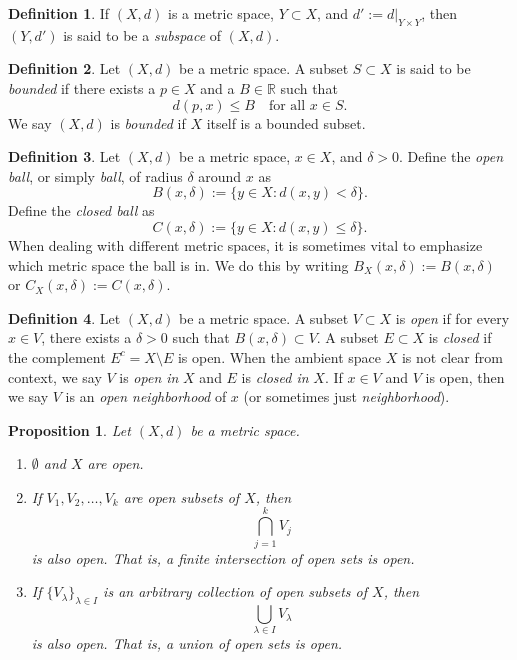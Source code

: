 \documentclass{article}
\newtheorem{proposition}{Proposition}[section]
\theoremstyle{definition}
\newtheorem{definition}{Definition}[section]
\theoremstyle{remark}
\begin{document}
\begin{definition} \label{def:metric_subspace}
If \( (X, d) \) is a metric space, \( Y \subset X \), and \( d' := d|_{Y \times Y} \), then \( (Y, d') \) is said to be a \textit{subspace} of \( (X, d) \).
\end{definition}

\begin{definition} \label{def:bounded_subset}
Let \( (X, d) \) be a metric space. A subset \( S \subset X \) is said to be \textit{bounded} if there exists a \( p \in X \) and a \( B \in \mathbb{R} \) such that
\[
d(p, x) \leq B \quad \text{for all } x \in S.
\]
We say \( (X, d) \) is \textit{bounded} if \( X \) itself is a bounded subset.
\end{definition}

\begin{definition} \label{def:open_closed_ball}
Let \( (X, d) \) be a metric space, \( x \in X \), and \( \delta > 0 \). Define the \textit{open ball}, or simply \textit{ball}, of radius \( \delta \) around \( x \) as
\[
B(x, \delta) := \{ y \in X : d(x,y) < \delta \}.
\]
Define the \textit{closed ball} as
\[
C(x, \delta) := \{ y \in X : d(x,y) \leq \delta \}.
\]
When dealing with different metric spaces, it is sometimes vital to emphasize which metric space the ball is in. We do this by writing \( B_X(x, \delta) := B(x, \delta) \) or \( C_X(x, \delta) := C(x, \delta) \).
\end{definition}

\begin{definition} \label{def:open_closed_sets}
Let \( (X, d) \) be a metric space. A subset \( V \subset X \) is \textit{open} if for every \( x \in V \), there exists a \( \delta > 0 \) such that \( B(x, \delta) \subset V \). A subset \( E \subset X \) is \textit{closed} if the complement \( E^c = X \setminus E \) is open. When the ambient space \( X \) is not clear from context, we say \( V \) is \textit{open in} \( X \) and \( E \) is \textit{closed in} \( X \).
If \( x \in V \) and \( V \) is open, then we say \( V \) is an \textit{open neighborhood} of \( x \) (or sometimes just \textit{neighborhood}).
\end{definition}

\begin{proposition} \label{prop:open_sets}
Let \( (X, d) \) be a metric space.
\begin{enumerate}
\item \( \emptyset \) and \( X \) are open.
\item If \( V_1, V_2, \dots, V_k \) are open subsets of \( X \), then
\[
\bigcap_{j=1}^{k} V_j
\]
is also open. That is, a finite intersection of open sets is open.
\item If \( \{ V_{\lambda} \}_{\lambda \in I} \) is an arbitrary collection of open subsets of \( X \), then
\[
\bigcup_{\lambda \in I} V_{\lambda}
\]
is also open. That is, a union of open sets is open.
\end{enumerate}
\end{proposition}
\end{document}
